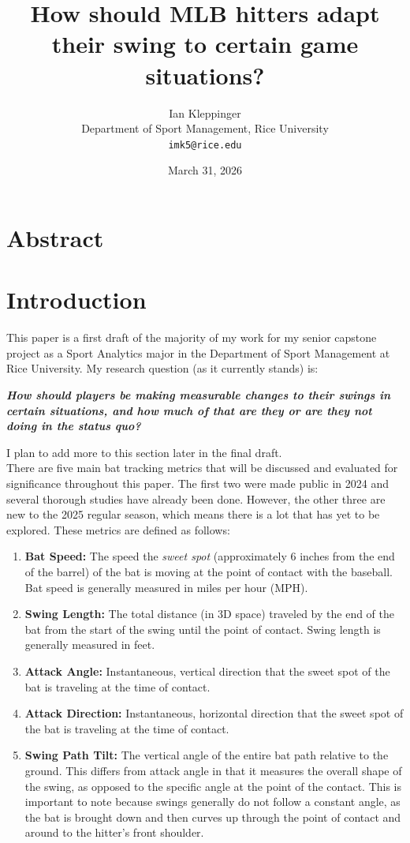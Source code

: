 \documentclass[12pt]{article}
\title{How should MLB hitters adapt their swing to certain game situations?}
\author{
  Ian Kleppinger \\
  Department of Sport Management, Rice University\\
  \texttt{imk5@rice.edu}
}
\date{March 31, 2026}
\begin{document}
\maketitle

\section{Abstract}
\section{Introduction}
This paper is a first draft of the majority of my work for my senior capstone project as a Sport Analytics major in the Department of Sport Management at Rice University. My research question (as it currently stands) is: 
\begin{center}
\begin{minipage}{0.75\textwidth}
\centering
\itshape
\textbf{
How should players be making measurable changes to their swings in certain situations, and how much of that are they or are they not doing in the status quo?}
\end{minipage}
\end{center}
I plan to add more to this section later in the final draft.\\
There are five main bat tracking metrics that will be discussed and evaluated for significance throughout this paper. The first two were made public in 2024 and several thorough studies have already been done. However, the other three are new to the 2025 regular season, which means there is a lot that has yet to be explored. These metrics are defined as follows:
\begin{enumerate}
    \item \textbf{Bat Speed:} The speed the \textit{sweet spot} (approximately 6 inches from the end of the barrel) of the bat is moving at the point of contact with the baseball. Bat speed is generally measured in miles per hour (MPH).
    \item \textbf{Swing Length:} The total distance (in 3D space) traveled by the end of the bat from the start of the swing until the point of contact. Swing length is generally measured in feet.
    \item \textbf{Attack Angle:} Instantaneous, vertical direction that the sweet spot of the bat is traveling at the time of contact.
    \item \textbf{Attack Direction:} Instantaneous, horizontal direction that the sweet spot of the bat is traveling at the time of contact.
    \item \textbf{Swing Path Tilt:} The vertical angle of the entire bat path relative to the ground. This differs from attack angle in that it measures the overall shape of the swing, as opposed to the specific angle at the point of the contact. This is important to note because swings generally do not follow a constant angle, as the bat is brought down and then curves up through the point of contact and around to the hitter's front shoulder.
\end{enumerate}
\end{document}
